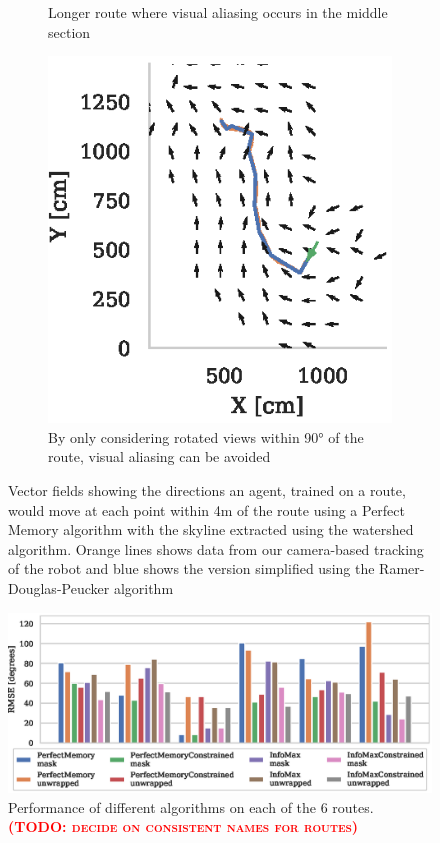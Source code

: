 \documentclass[letterpaper]{article}
\newcommand{\todo}[1]{\textbf{\textsc{\textcolor{red}{(TODO: #1)}}}}
\begin{document}
\begin{figure}[t]
\begin{subfigure}[b]{0.3\textwidth}
        \caption{Longer route where visual aliasing occurs in the middle section}
        \label{fig:vector_fields/route5_perfect_memory_mask}
    \end{subfigure}
    \begin{subfigure}[b]{0.3\textwidth}
        \includegraphics{figures/vector_field_route5_PerfectMemoryConstrained_mask.eps}
        \caption{By only considering rotated views within 90° of the route, visual aliasing can be avoided}
        \label{fig:vector_fields/route5_perfect_memory_constrained_mask}
    \end{subfigure}
    
    \caption{Vector fields showing the directions an agent, trained on a route, would move at each point within 4m of the route using a Perfect Memory algorithm with the skyline extracted using the watershed algorithm. 
    Orange lines shows data from our camera-based tracking of the robot and blue shows the version simplified using the Ramer-Douglas-Peucker algorithm~\citep{Ramer1972}}
    \label{fig:vector_fields}
\end{figure}
    
\begin{figure}[t]
    \centering
    \includegraphics{figures/route_benchmark.eps}
    \caption{Performance of different algorithms on each of the 6 routes. \todo{decide on consistent names for routes}}
    \label{fig:route_benchmark}
\end{figure}
\end{document}
